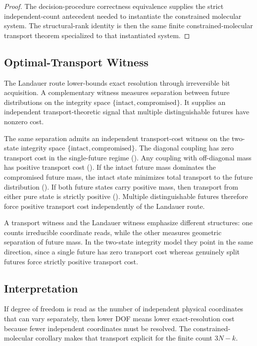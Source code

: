 \begin{proof}
The decision-procedure correctness equivalence supplies the strict independent-count antecedent needed to instantiate the constrained molecular system. The structural-rank identity is then the same finite constrained-molecular transport theorem specialized to that instantiated system.
\end{proof}

\subsection{Optimal-Transport Witness}

The Landauer route lower-bounds exact resolution through irreversible bit acquisition. A complementary witness measures separation between future distributions on the integrity space $\{\mathrm{intact},\mathrm{compromised}\}$. It supplies an independent transport-theoretic signal that multiple distinguishable futures have nonzero cost.

\begin{remark}\label{rem:wasserstein-bridge}
The same separation admits an independent transport-cost witness on the two-state integrity space $\{\mathrm{intact},\mathrm{compromised}\}$. The diagonal coupling has zero transport cost in the single-future regime (). Any coupling with off-diagonal mass has positive transport cost (). If the intact future mass dominates the compromised future mass, the intact state minimizes total transport to the future distribution (). If both future states carry positive mass, then transport from either pure state is strictly positive (). Multiple distinguishable futures therefore force positive transport cost independently of the Landauer route.
\end{remark}

A transport witness and the Landauer witness emphasize different structures: one counts irreducible coordinate reads, while the other measures geometric separation of future mass. In the two-state integrity model they point in the same direction, since a single future has zero transport cost whereas genuinely split futures force strictly positive transport cost.

\subsection{Interpretation}

If degree of freedom is read as the number of independent physical coordinates that can vary separately, then lower DOF means lower exact-resolution cost because fewer independent coordinates must be resolved. The constrained-molecular corollary makes that transport explicit for the finite count $3N-k$.

